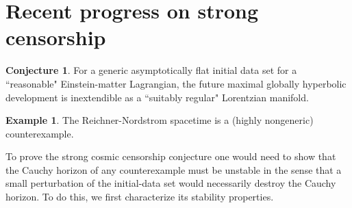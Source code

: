 \documentclass[12pt]{report}
\theoremstyle{definition}
\newtheorem{conjecture}[theorem]{Conjecture}
\newtheorem{example}[theorem]{Example}
\theoremstyle{remark}
\begin{document}
\section{Recent progress on strong censorship}
\begin{conjecture}
    For a generic asymptotically flat initial data set for a ``reasonable" Einstein-matter Lagrangian, the future maximal globally hyperbolic development is inextendible as a ``suitably regular" Lorentzian manifold.
\end{conjecture}
\begin{example}
    The Reichner-Nordstrom spacetime is a (highly nongeneric) counterexample.
\end{example}
    To prove the strong cosmic censorship conjecture one would need to show that the Cauchy horizon of any counterexample must be unstable in the sense that a small perturbation of the initial-data set would necessarily destroy the Cauchy horizon. To do this, we first characterize its stability properties.
\end{document}
